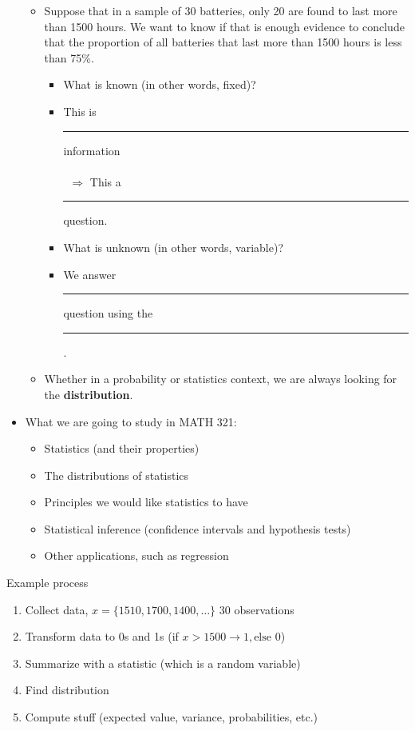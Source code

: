 \documentclass{article}
\newcommand{\blankul}[1]{\rule[-1.5mm]{#1}{0.15mm}}	%
\begin{document}
\begin{itemize}
\begin{itemize}
        \item Suppose that in a sample of 30 batteries, only 20 are found to last more than 1500 hours. We want to know if that is enough evidence to conclude that the proportion of all batteries that last more than 1500 hours is less than 75\%.
        \begin{itemize}
            \item What is known (in other words, fixed)?
             \item[] This is \blankul{3cm} information\\\\\
             $\Longrightarrow$ This a \blankul{3cm} question.
            \item What is unknown (in other words, variable)?\\
            \item We answer \blankul{3cm} question using the \blankul{5cm}.
        \end{itemize}
        \item Whether in a probability or statistics context, we are always looking for the \textbf{distribution}.
    \end{itemize}\bigskip
    \item What we are going to study in MATH 321:
        \begin{itemize}
            \item Statistics (and their properties)
            \item The distributions of statistics
            \item Principles we would like statistics to have%
            \item Statistical inference (confidence intervals and hypothesis tests)
            \item Other applications, such as regression
        \end{itemize}
\end{itemize}\bigskip

Example process\bigskip
\begin{enumerate}
    \item Collect data, $x = \{1510, 1700, 1400, \ldots\}$ 30 observations
    \item Transform data to 0s and 1s (if $x > 1500 \rightarrow 1, \text{else } 0$)
    \item Summarize with a statistic (which is a random variable)
    \item Find distribution
    \item Compute stuff (expected value, variance, probabilities, etc.)
\end{enumerate}
\end{document}
